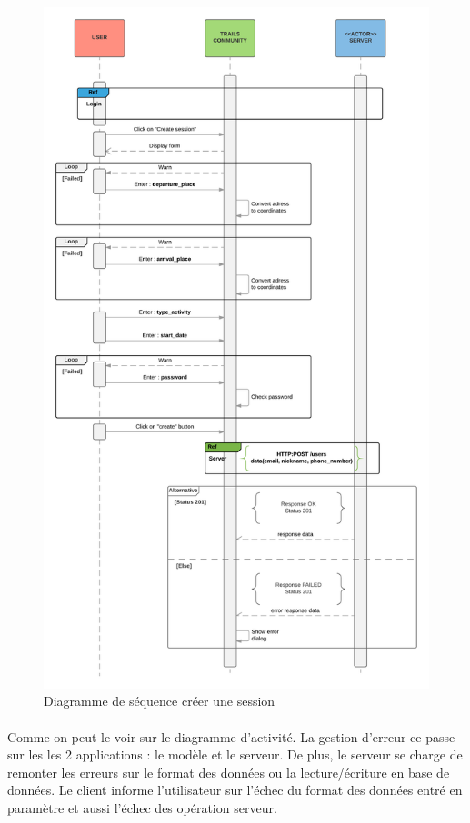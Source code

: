 \documentclass[titlepage, 12pt]{report}
\begin{document}
\begin{figure}[!h]
	\caption{Diagramme de séquence créer une session}
	\label{create_session_sequence_diagram}
	\centering
	\includegraphics[scale=0.5]{Images/diagram/create_session_sequence_diagram.png}
\end{figure}

\paragraph{}Comme on peut le voir sur le diagramme d'activité. La gestion d'erreur ce passe sur les les 2 applications : le modèle et le serveur. De plus, le serveur se charge de remonter les erreurs sur le format des données ou la lecture/écriture en base de données. Le client informe l'utilisateur sur l'échec du format des données entré en paramètre et aussi l'échec des opération serveur.
\end{document}
